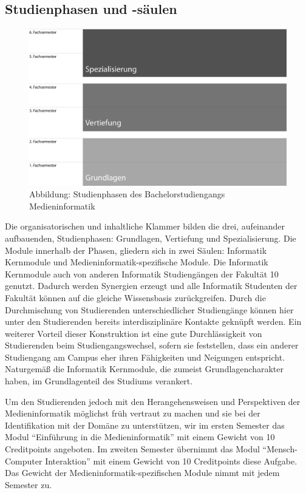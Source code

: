 \subsection{Studienphasen und
-säulen}\label{studienphasen-und--suxe4ulen}

\begin{figure}[htbp]
\centering
\includegraphics[width=\columnwidth]{../anhaenge/bilder/ba-studienphasen.png}
\caption{Abbildung: Studienphasen des Bachelorstudiengangs
Medieninformatik}
\end{figure}

Die organisatorischen und inhaltliche Klammer bilden die drei,
aufeinander aufbauenden, Studienphasen: Grundlagen, Vertiefung und
Spezialisierung. Die Module innerhalb der Phasen, gliedern sich in zwei
Säulen: Informatik Kernmodule und Medieninformatik-spezifische Module.
Die Informatik Kernmodule auch von anderen Informatik Studiengängen der
Fakultät 10 genutzt. Dadurch werden Synergien erzeugt und alle
Informatik Studenten der Fakultät können auf die gleiche Wissensbasis
zurückgreifen. Durch die Durchmischung von Studierenden
unterschiedlicher Studiengänge können hier unter den Studierenden
bereits interdisziplinäre Kontakte geknüpft werden. Ein weiterer Vorteil
dieser Konstruktion ist eine gute Durchlässigkeit von Studierenden beim
Studiengangswechsel, sofern sie feststellen, dass ein anderer
Studiengang am Campus eher ihren Fähigkeiten und Neigungen entspricht.
Naturgemäß die Informatik Kernmodule, die zumeist Grundlagencharakter
haben, im Grundlagenteil des Studiums verankert.

Um den Studierenden jedoch mit den Herangehensweisen und Perspektiven
der Medieninformatik möglichst früh vertraut zu machen und sie bei der
Identifikation mit der Domäne zu unterstützen, wir im ersten Semester
das Modul ``Einführung in die Medieninformatik'' mit einem Gewicht von
10 Creditpoints angeboten. Im zweiten Semester übernimmt das Modul
``Mensch-Computer Interaktion'' mit einem Gewicht von 10 Creditpoints
diese Aufgabe. Das Gewicht der Medieninformatik-spezifischen Module
nimmt mit jedem Semester zu.

